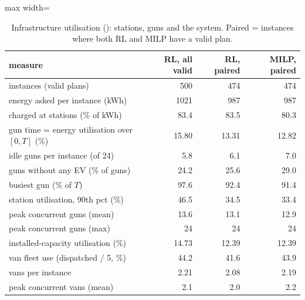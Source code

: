 \begin{table}[H]\centering
\caption{Infrastructure utilisation (): stations, guns and the system. Paired = instances where both RL and MILP have a valid plan.}\label{tab:utilsystem}
\begin{adjustbox}{max width=\textwidth}\begin{tabular}{lrrr}\toprule
measure & RL, all valid & RL, paired & MILP, paired \\ \midrule
instances (valid plans) & 500 & 474 & 474 \\
energy asked per instance (kWh) & 1021 & 987 & 987 \\
charged at stations (\% of kWh) & 83.4 & 83.5 & 80.3 \\
gun time = energy utilisation over $[0,T]$ (\%) & 15.80 & 13.31 & 12.82 \\
idle guns per instance (of 24) & 5.8 & 6.1 & 7.0 \\
guns without any EV (\% of guns) & 24.2 & 25.6 & 29.0 \\
busiest gun (\% of $T$) & 97.6 & 92.4 & 91.4 \\
station utilisation, 90th pct (\%) & 46.5 & 34.5 & 33.4 \\
peak concurrent guns (mean) & 13.6 & 13.1 & 12.9 \\
peak concurrent guns (max) & 24 & 24 & 24 \\
installed-capacity utilisation (\%) & 14.73 & 12.39 & 12.39 \\
van fleet use (dispatched / 5, \%) & 44.2 & 41.6 & 43.9 \\
vans per instance & 2.21 & 2.08 & 2.19 \\
peak concurrent vans (mean) & 2.1 & 2.0 & 2.2 \\
\bottomrule\end{tabular}\end{adjustbox}\end{table}
